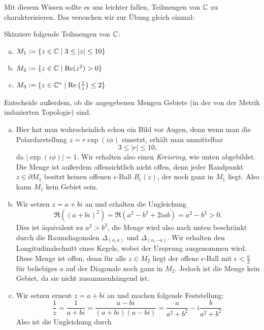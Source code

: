 Mit diesem Wissen sollte es uns leichter fallen, Teilmengen von $\mathbb{C}$ zu charakterisieren. Das versuchen wir zur Übung gleich einmal:
\begin{übung}
Skizziere folgende Teilmengen von $\mathbb{C}$:
\begin{enumerate}[(a)]
\item $M_1 := \{z \in \mathbb{C} \mid 3 \leq |z| \leq 10 \}$
\item $M_2 := \{z \in \mathbb{C} \mid \Re(z^2) > 0 \}$
\item $M_3 := \{z \in \mathbb{C}^\ast \mid \Re \left( \frac{1}{z}\right) \leq 2\}$
\end{enumerate}
Entscheide außerdem, ob die angegebenen Mengen Gebiete (in der von der Metrik induzierten Topologie) sind.
\end{übung}
\begin{lösung}
\begin{enumerate}[(a)]
\item Hier hat man wahrscheinlich schon ein Bild vor Augen, denn wenn man die Polardarstellung $z=r\exp(i \phi)$ einsetzt, erhält man unmittelbar 
\begin{equation}
	3 \leq |r| \leq 10,
\end{equation}
da $|\exp(i \phi)|=1$. Wir erhalten also einen \textit{Kreisring}, wie unten abgebildet. Die Menge ist außerdem offensichtlich nicht offen, denn jeder Randpunkt $z \in \partial M_1$ besitzt keinen offenen $\epsilon$-Ball $B_\epsilon(z)$, der noch ganz in $M_1$ liegt. Also kann $M_1$ kein Gebiet sein.
\item Wir setzen $z=a+bi$ an und erhalten die Ungleichung 
\begin{equation}
\Re((a+bi)^2) = \Re(a^2-b^2+2iab)=a^2-b^2 >0.
\end{equation}
Dies ist äquivalent zu $a^2 > b^2$, die Menge wird also nach unten beschränkt durch die Raumdiagonalen $\Delta_{(a,a)}$ und $\Delta_{(a,-a)}$. Wir erhalten den Longitudinalschnitt eines Kegels, wobei der Ursprung ausgenommen wird. Diese Menge ist offen, denn für alle $z \in M_2$ liegt der offene $\epsilon$-Ball mit $\epsilon<\frac{a}{2}$ für beliebiges $a$ auf der Diagonale noch ganz in $M_2$. Jedoch ist die Menge kein Gebiet, da sie nicht zusammenhängend ist.
\item Wir setzen erneut $z=a+bi$ an und machen folgende Feststellung:
\begin{equation}
\frac{1}{z}=\frac{1}{a+bi}=\frac{a-bi}{(a+bi)(a-bi)}=\frac{a}{a^2+b^2} - i \frac{b}{a^2+b^2}.
\end{equation}
Also ist die Ungleichung durch 

\end{enumerate}
\end{lösung}
